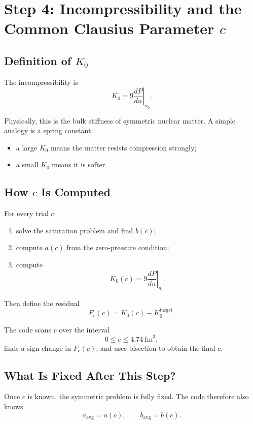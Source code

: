 \documentclass[11pt]{article}
\begin{document}
\section{Step 4: Incompressibility and the Common Clausius Parameter \texorpdfstring{$c$}{c}}

\subsection{Definition of \texorpdfstring{$K_0$}{K0}}

The incompressibility is
\begin{equation}
K_0
=
9\left.\frac{dP}{dn}\right|_{n_0}.
\end{equation}

Physically, this is the bulk stiffness of symmetric nuclear matter. A simple
analogy is a spring constant:
\begin{itemize}
\item a large $K_0$ means the matter resists compression strongly;
\item a small $K_0$ means it is softer.
\end{itemize}

\subsection{How \texorpdfstring{$c$}{c} Is Computed}

For every trial $c$:
\begin{enumerate}
\item solve the saturation problem and find $b(c)$;
\item compute $a(c)$ from the zero-pressure condition;
\item compute
\[
K_0(c)=9\left.\frac{dP}{dn}\right|_{n_0}.
\]
\end{enumerate}

Then define the residual
\begin{equation}
F_c(c)=K_0(c)-K_0^{\mathrm{target}}.
\end{equation}

The code scans $c$ over the interval
\[
0\le c\le 4.74\ \mathrm{fm}^3,
\]
finds a sign change in $F_c(c)$, and uses bisection to obtain the final
$c$.

\subsection{What Is Fixed After This Step?}

Once $c$ is known, the symmetric problem is fully fixed. The code therefore
also knows
\begin{equation}
a_{\mathrm{avg}}=a(c),\qquad b_{\mathrm{avg}}=b(c).
\end{equation}
\end{document}
